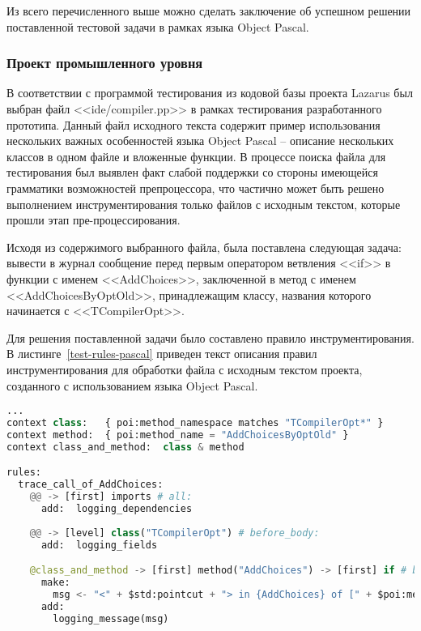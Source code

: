 Из всего перечисленного выше можно сделать заключение об успешном решении поставленной тестовой задачи в рамках языка Object Pascal.

\subsubsection{Проект промышленного уровня}

В соответствии с программой тестирования из кодовой базы проекта Lazarus был выбран файл <<ide/compiler.pp>> в рамках тестирования разработанного прототипа.
Данный файл исходного текста содержит пример использования нескольких важных особенностей языка Object Pascal -- описание нескольких классов в одном файле и вложенные функции.
В процессе поиска файла для тестирования был выявлен факт слабой поддержки со стороны имеющейся грамматики возможностей препроцессора, что частично может быть решено выполнением инструментирования только файлов с исходным текстом, которые прошли этап пре-процессирования.

Исходя из содержимого выбранного файла, была поставлена следующая задача:
вывести в журнал сообщение перед первым оператором ветвления <<if>> в функции с именем <<AddChoices>>, заключенной в метод с именем <<AddChoicesByOptOld>>, принадлежащим классу, названия которого начинается с <<TCompilerOpt>>.

Для решения поставленной задачи было составлено правило инструментирования.
В листинге~\ref{test-rules-pascal} приведен текст описания правил инструментирования для обработки файла с исходным текстом проекта, созданного с использованием языка Object Pascal.

\begin{lstlisting}[frame=single, language=Python, label={test-rules-pascal}, caption={Описание правил инструментирования. Object Pascal-проект.}]
...
context class:   { poi:method_namespace matches "TCompilerOpt*" }
context method:  { poi:method_name = "AddChoicesByOptOld" }
context class_and_method:  class & method

rules:
  trace_call_of_AddChoices:
    @@ -> [first] imports # all:
      add:  logging_dependencies
  
    @@ -> [level] class("TCompilerOpt") # before_body:
      add:  logging_fields

    @class_and_method -> [first] method("AddChoices") -> [first] if # before:
      make:
        msg <- "<" + $std:pointcut + "> in {AddChoices} of [" + $poi:method_name_full + "] method";
      add:
        logging_message(msg)
\end{lstlisting}

